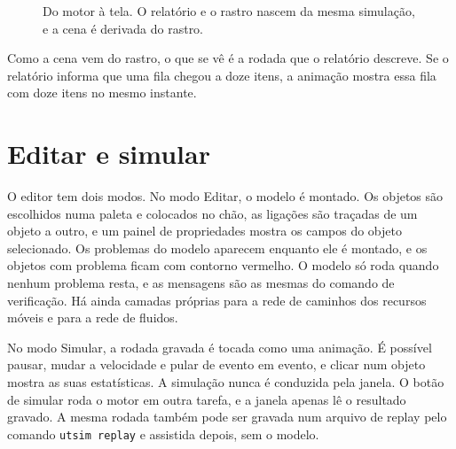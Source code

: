 \begin{figure}[ht]
\centering
{}
\caption{Do motor à tela. O relatório e o rastro nascem da mesma simulação, e a cena é derivada do rastro.}
\label{fig-rastro}
\end{figure}

Como a cena vem do rastro, o que se vê é a rodada que o relatório descreve. Se o relatório informa que uma fila chegou a doze itens, a animação mostra essa fila com doze itens no mesmo instante.

\section{Editar e simular}

O editor tem dois modos. No modo Editar, o modelo é montado. Os objetos são escolhidos numa paleta e colocados no chão, as ligações são traçadas de um objeto a outro, e um painel de propriedades mostra os campos do objeto selecionado. Os problemas do modelo aparecem enquanto ele é montado, e os objetos com problema ficam com contorno vermelho. O modelo só roda quando nenhum problema resta, e as mensagens são as mesmas do comando de verificação. Há ainda camadas próprias para a rede de caminhos dos recursos móveis e para a rede de fluidos.

No modo Simular, a rodada gravada é tocada como uma animação. É possível pausar, mudar a velocidade e pular de evento em evento, e clicar num objeto mostra as suas estatísticas. A simulação nunca é conduzida pela janela. O botão de simular roda o motor em outra tarefa, e a janela apenas lê o resultado gravado. A mesma rodada também pode ser gravada num arquivo de replay pelo comando \texttt{utsim replay} e assistida depois, sem o modelo.

